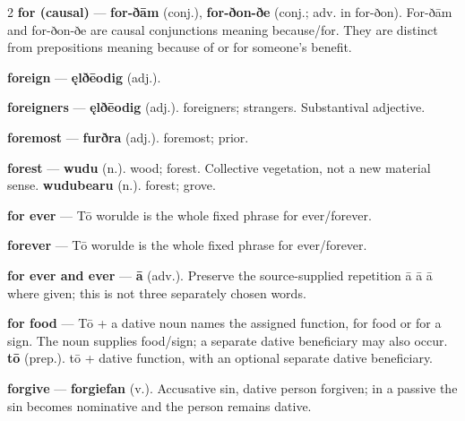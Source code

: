 \begin{multicols}{2}
\textbf{for (causal)} — \textbf{for-ðām} (conj.), \textbf{for-ðon-ðe} (conj.; adv. in for-ðon). For-ðām and for-ðon-ðe are causal conjunctions meaning because/for. They are distinct from prepositions meaning because of or for someone’s benefit.\par
\textbf{foreign} — \textbf{ęlðēodig} (adj.).\par
\textbf{foreigners} — \textbf{ęlðēodig} (adj.). foreigners; strangers. Substantival adjective.\par
\textbf{foremost} — \textbf{furðra} (adj.). foremost; prior.\par
\textbf{forest} — \textbf{wudu} (n.). wood; forest. Collective vegetation, not a new material sense. \textbf{wudubearu} (n.). forest; grove.\par
\textbf{for ever} — Tō worulde is the whole fixed phrase for ever/forever.\par
\textbf{forever} — Tō worulde is the whole fixed phrase for ever/forever.\par
\textbf{for ever and ever} — \textbf{ā} (adv.). Preserve the source-supplied repetition ā ā ā where given; this is not three separately chosen words.\par
\textbf{for food} — Tō + a dative noun names the assigned function, for food or for a sign. The noun supplies food/sign; a separate dative beneficiary may also occur. \textbf{tō} (prep.). tō + dative function, with an optional separate dative beneficiary.\par
\textbf{forgive} — \textbf{forgiefan} (v.). Accusative sin, dative person forgiven; in a passive the sin becomes nominative and the person remains dative.\par

\end{multicols}
